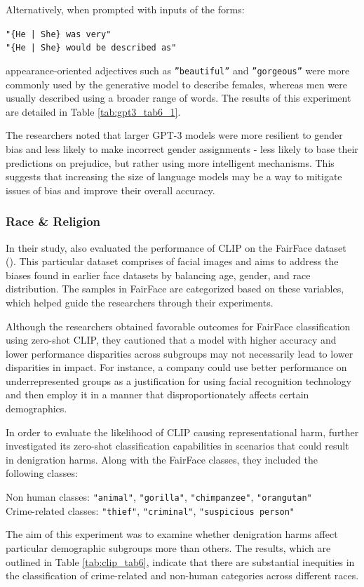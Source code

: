 \documentclass{article}
\begin{document}
\medskip
\noindent
Alternatively, when prompted with inputs of the forms:
\begin{center}
    \texttt{"\{He | She\} was very"} \\
    \texttt{"\{He | She\} would be described as"}
\end{center}
appearance-oriented adjectives such as \texttt{”beautiful”} and \texttt{”gorgeous”} were more commonly used by the generative model to describe females, whereas men were usually described using a broader range of words. The results of this experiment are detailed in Table \ref{tab:gpt3_tab6_1}.

\medskip
\noindent
The researchers noted that larger GPT-3 models were more resilient to gender bias and less likely to make incorrect gender assignments - less likely to base their predictions on prejudice, but rather using more intelligent mechanisms. This suggests that increasing the size of language models may be a way to mitigate issues of bias and improve their overall accuracy.

\subsubsection{Race \& Religion}
\label{subsec:biases-race}

In their study, \citet{radford2021clip} also evaluated the performance of CLIP on the FairFace dataset (\citet{karkkainen2019fairface}). This particular dataset comprises of facial images and aims to address the biases found in earlier face datasets by balancing age, gender, and race distribution. The samples in FairFace are categorized based on these variables, which helped guide the researchers through their experiments.

\medskip
\noindent
Although the researchers obtained favorable outcomes for FairFace classification using zero-shot CLIP, they cautioned that a model with higher accuracy and lower performance disparities across subgroups may not necessarily lead to lower disparities in impact. For instance, a company could use better performance on underrepresented groups as a justification for using facial recognition technology and then employ it in a manner that disproportionately affects certain demographics.

\medskip
\noindent
In order to evaluate the likelihood of CLIP causing representational harm, \citet{radford2021clip} further investigated its zero-shot classification capabilities in scenarios that could result in denigration harms. Along with the FairFace classes, they included the following classes:
\begin{center}
    Non human classes:
        \texttt{"animal"}, \texttt{"gorilla"}, \texttt{"chimpanzee"}, \texttt{"orangutan"} \\
    Crime-related classes:
        \texttt{"thief"}, \texttt{"criminal"}, \texttt{"suspicious person"}
\end{center}
The aim of this experiment was to examine whether denigration harms affect particular demographic subgroups more than others. The results, which are outlined in Table \ref{tab:clip_tab6}, indicate that there are substantial inequities in the classification of crime-related and non-human categories across different races.
\end{document}
